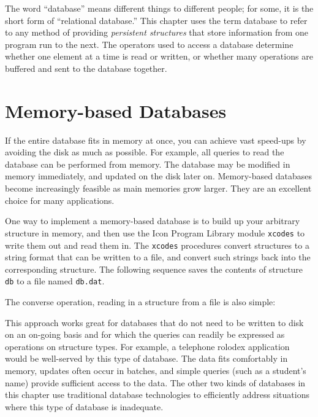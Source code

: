 The word ``database'' means different things to different people; for
some, it is the short form of ``relational database.'' This chapter
uses the term database to refer to any method of providing
{\em persistent structures\/} that store information from one program
run to the next. The operators used to access a database determine
whether one element at a time is read or written, or whether many
operations are buffered and sent to the database together.

\section{Memory-based Databases}

If the entire database fits in memory at once, you can achieve vast
speed-ups by avoiding the disk as much as possible. For example, all
queries to read the database can be performed from memory.  The
database may be modified in memory immediately, and updated on the
disk later on. Memory-based databases become increasingly feasible
as main memories grow larger. They are an excellent choice
for many applications.

One way to implement a memory-based database is to build up your
arbitrary structure in memory, and then use the Icon Program Library
module \texttt{xcodes} to write them out and read them
in. The \texttt{xcodes} procedures convert structures
to a string format that can be written to a file, and convert
such strings back into the corresponding structure.
The following sequence saves the
contents of structure \texttt{db} to a file named \texttt{db.dat}.


\noindent
The converse operation, reading in a structure from a file is also
simple:


This approach works great for databases that do not need to be written
to disk on an on-going basis and for which the queries can readily be
expressed as operations on structure types. For example, a telephone
rolodex application would be well-served by this type of database. The
data fits comfortably in memory, updates often occur in batches, and
simple queries (such as a student's name) provide
sufficient access to the data. The other two kinds of databases in this
chapter use traditional database technologies to efficiently address
situations where this type of database is inadequate.


